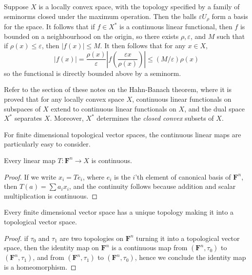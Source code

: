 \begin{example}
    Suppose $X$ is a locally convex space, with the topology specified by a family of seminorms closed under the maximum operation. Then the balls $\varepsilon U_\rho$ form a basis for the space. It follows that if $f \in X^*$ is a continuous linear functional, then $f$ is bounded on a neighbourhood on the origin, so there exists $\rho, \varepsilon$, and $M$ such that if $\rho(x) \leq \varepsilon$, then $|f(x)| \leq M$. It then follows that for any $x \in X$,
    \[ |f(x)| = \frac{\rho(x)}{\varepsilon} \left| f \left( \frac{\varepsilon x}{\rho(x)} \right) \right| \leq (M/\varepsilon) \rho(x) \]
    so the functional is directly bounded above by a seminorm.
\end{example}

Refer to the section of these notes on the Hahn-Banach theorem, where it is proved that for any locally convex space $X$, continuous linear functionals on subspaces of $X$ extend to continuous linear functionals on $X$, and the dual space $X^*$ separates $X$. Moreover, $X^*$ determines the \emph{closed convex} subsets of $X$.

For finite dimensional topological vector spaces, the continuous linear maps are particularly easy to consider.

\begin{lemma}
    Every linear map $T: \mathbf{F}^n \to X$ is continuous.
\end{lemma}
\begin{proof}
    If we write $x_i = Te_i$, where $e_i$ is the $i$'th element of canonical basis of $\mathbf{F}^n$, then $T(a) = \sum a_i x_i$, and the continuity follows because addition and scalar multiplication is continuous.
\end{proof}

\begin{corollary}
    Every finite dimensional vector space has a unique topology making it into a topological vector space.
\end{corollary}
\begin{proof}
    if $\tau_0$ and $\tau_1$ are two topologies on $\mathbf{F}^n$ turning it into a topological vector space, then the identity map on $\mathbf{F}^n$ is a continuous map from $(\mathbf{F}^n, \tau_0)$ to $(\mathbf{F}^n, \tau_1)$, and from $(\mathbf{F}^n, \tau_1)$ to $(\mathbf{F}^n, \tau_0)$, hence we conclude the identity map is a homeomorphism.
\end{proof}

